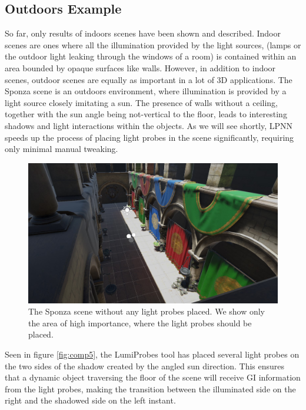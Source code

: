 \subsection{Outdoors Example}
\label{sec:outdoors}

So far, only results of indoors scenes have been shown and described. Indoor scenes are ones where all the illumination provided by the light sources, (lamps or the outdoor light leaking through the windows of a room) is contained within an area bounded by opaque surfaces like walls. However, in addition to indoor scenes, outdoor scenes are equally as important in a lot of 3D applications. The Sponza scene \parencite{Sponza2017} is an outdoors environment, where illumination is provided by a light source closely imitating a sun. The presence of walls without a ceiling, together with the sun angle being not-vertical to the floor, leads to interesting shadows and light interactions within the objects. As we will see shortly, LPNN speeds up the process of placing light probes in the scene significantly, requiring only minimal manual tweaking.

\begin{figure}[h]
	\centering
	\includegraphics[width=\linewidth]{Graphics/results/sponza.jpg}
	\caption{The Sponza scene \parencite{Sponza2017} without any light probes placed. We show only the area of high importance, where the light probes should be placed.}
	\label{fig:sponza}
\end{figure}

Seen in figure \ref{fig:comp5}, the LumiProbes tool has placed several light probes on the two sides of the shadow created by the angled sun direction. This ensures that a dynamic object traversing the floor of the scene will receive GI information from the light probes, making the transition between the illuminated side on the right and the shadowed side on the left instant. 

